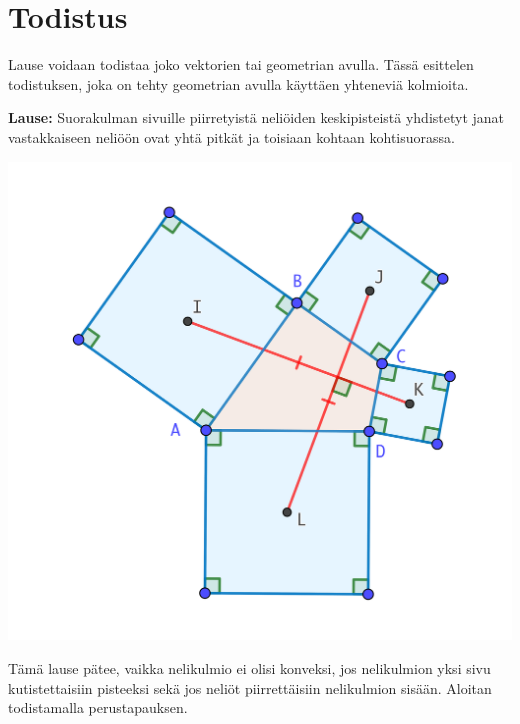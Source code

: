 \documentclass{scrartcl}
\begin{document}
\pagebreak
\section{Todistus}
Lause voidaan todistaa joko vektorien tai geometrian avulla. Tässä esittelen todistuksen, joka on tehty geometrian avulla käyttäen yhteneviä kolmioita.

\smallskip
\textbf{Lause:} Suorakulman sivuille piirretyistä neliöiden keskipisteistä yhdistetyt janat vastakkaiseen neliöön ovat yhtä pitkät ja toisiaan kohtaan kohtisuorassa. 
\begin{center}
    \includegraphics[scale=0.3]{todistuskuva}
\end{center}

Tämä lause pätee, vaikka nelikulmio ei olisi konveksi, jos nelikulmion yksi sivu kutistettaisiin pisteeksi sekä jos neliöt piirrettäisiin nelikulmion sisään. Aloitan todistamalla perustapauksen.
\end{document}
